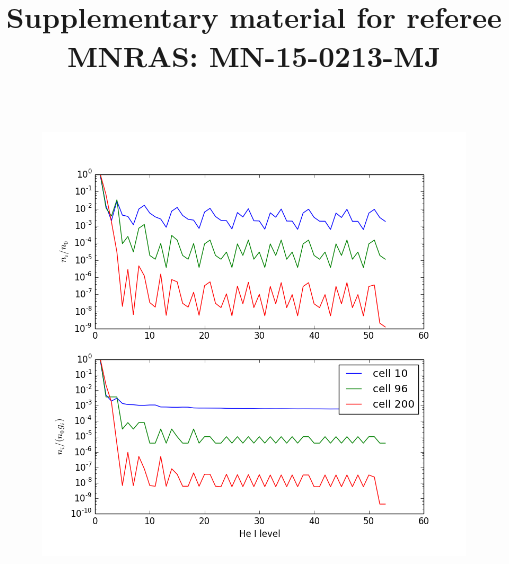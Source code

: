 \documentclass{article}
\begin{document}
\title{Supplementary material for referee\\MNRAS: MN-15-0213-MJ}
\maketitle

\begin{figure}	%
\centering
\includegraphics[width=1.0\textwidth]{pops.png}
\caption{
}
\label{novalikes}
\end{figure}
\end{document}
